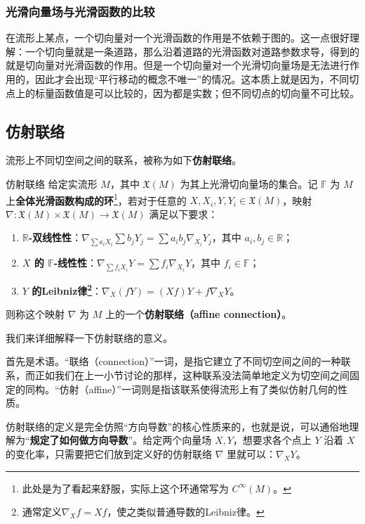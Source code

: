 \subsubsection{光滑向量场与光滑函数的比较}

在流形上某点，一个切向量对一个光滑函数的作用是不依赖于图的。这一点很好理解：一个切向量就是一条道路，那么沿着道路的光滑函数对道路参数求导，得到的就是切向量对光滑函数的作用。但是一个切向量对一个光滑切向量场是无法进行作用的，因此才会出现“平行移动的概念不唯一”的情况。这本质上就是因为，不同切点上的标量函数值是可以比较的，因为都是实数；但不同切点的切向量不可比较。


\subsection{仿射联络}

流形上不同切空间之间的联系，被称为如下\textbf{仿射联络}。

\begin{definition}{仿射联络}
给定实流形 $M$，其中 $\mathfrak{X}(M)$ 为其上光滑切向量场的集合。记 $\mathbb{F}$ 为 $M$ 上\textbf{全体光滑函数构成的环}\footnote{此处是为了看起来舒服，实际上这个环通常写为 $C^\infty(M)$。}，若对于任意的 $X, X_i, Y, Y_i\in\mathfrak{X}(M)$，映射 $\nabla:\mathfrak{X}(M)\times\mathfrak{X}(M)\to\mathfrak{X}(M)$ 满足以下要求：
\begin{enumerate}
\item \textbf{$\mathbb{R}$-双线性性}：$\nabla_{\sum a_iX_i}\sum b_jY_j=\sum a_ib_j\nabla_{X_i}Y_j$，其中 $a_i, b_j\in\mathbb{R}$；
\item \textbf{$X$ 的 $\mathbb{F}$-线性性}：$\nabla_{\sum f_iX_i}Y=\sum f_i\nabla_{X_i}Y$，其中 $f_i\in\mathbb{F}$；
\item \textbf{$Y$ 的Leibniz律\footnote{通常定义$\nabla_X f=Xf$，使之类似普通导数的Leibniz律。}}：$\nabla_X(fY)=(Xf)Y+f\nabla_XY$。
\end{enumerate}
则称这个映射 $\nabla$ 为 $M$ 上的一个\textbf{仿射联络（affine connection）}。
\end{definition}

我们来详细解释一下仿射联络的意义。

首先是术语。“联络（connection）”一词，是指它建立了不同切空间之间的一种联系，而正如我们在上一小节讨论的那样，这种联系没法简单地定义为切空间之间固定的同构。“仿射（affine）”一词则是指该联系使得流形上有了类似仿射几何的性质。

仿射联络的定义是完全仿照“方向导数”的核心性质来的，也就是说，可以通俗地理解为“\textbf{规定了如何做方向导数}”。给定两个向量场 $X, Y$，想要求各个点上 $Y$ 沿着 $X$ 的变化率，只需要把它们放到定义好的仿射联络 $\nabla$ 里就可以：$\nabla_XY$。

